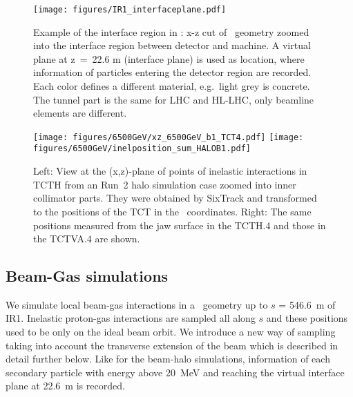 

\begin{figure}%
\begin{center}
\texttt{[image: figures/IR1\_interfaceplane.pdf]}
\end{center}
\vspace{-0.6cm}
 \caption{Example of the interface region in \fluka: x-z cut of \fluka~geometry zoomed into the interface region between detector and machine. A virtual plane at z~=~22.6 m (interface plane) is used as location, where information of particles entering the detector region are recorded. Each color defines a different material, e.g.~light grey is concrete. The tunnel part is the same for LHC and HL-LHC, only beamline elements are different.
  \label{flukaGeo_nominal}}
\end{figure}


\begin{figure}%
\begin{center}
  \texttt{[image: figures/6500GeV/xz\_6500GeV\_b1\_TCT4.pdf]}
  \texttt{[image: figures/6500GeV/inelposition\_sum\_HALOB1.pdf]}
\end{center}
\vspace{-0.6cm}
 \caption{Left: View at the (x,z)-plane of points of inelastic interactions in TCTH from an Run~2 halo simulation case zoomed into inner collimator parts. They were obtained by SixTrack and transformed to the positions of the TCT in the \fluka~coordinates. Right: The same positions measured from the jaw surface in the TCTH.4 and those in the TCTVA.4 are shown.
  \label{tctHits}}
\end{figure}


\subsection{Beam-Gas simulations \label{BGdescript}}

We simulate local beam-gas interactions in a \fluka~geometry up to $s$ = 546.6~m of IR1. Inelastic proton-gas interactions are sampled all along $s$ and these positions used to be only on the ideal beam orbit. We introduce a new way of sampling taking into account the transverse extension of the beam which is described in detail further below.
Like for the beam-halo simulations, information of each secondary particle with energy above 20~MeV and reaching the virtual interface plane at 22.6~m is recorded.

